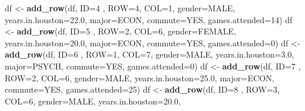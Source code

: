 \documentclass[
]{book}
\newenvironment{Shaded}{\begin{snugshade}}{\end{snugshade}}
\newcommand{\DataTypeTok}[1]{\textcolor[rgb]{0.13,0.29,0.53}{#1}}
\newcommand{\DecValTok}[1]{\textcolor[rgb]{0.00,0.00,0.81}{#1}}
\newcommand{\FloatTok}[1]{\textcolor[rgb]{0.00,0.00,0.81}{#1}}
\newcommand{\KeywordTok}[1]{\textcolor[rgb]{0.13,0.29,0.53}{\textbf{#1}}}
\newcommand{\NormalTok}[1]{#1}
\newcommand{\StringTok}[1]{\textcolor[rgb]{0.31,0.60,0.02}{#1}}
\begin{document}
\begin{Shaded}
\begin{Highlighting}[]
\NormalTok{df \textless{}{-}}\StringTok{ }\KeywordTok{add\_row}\NormalTok{(df, }\DataTypeTok{ID=}\DecValTok{4}\NormalTok{ , }\DataTypeTok{ROW=}\DecValTok{4}\NormalTok{, }\DataTypeTok{COL=}\DecValTok{1}\NormalTok{,  }\DataTypeTok{gender=}\StringTok{\textquotesingle{}MALE\textquotesingle{}}\NormalTok{,   }\DataTypeTok{years.in.houston=}\FloatTok{22.0}\NormalTok{,}
              \DataTypeTok{major=}\StringTok{\textquotesingle{}ECON\textquotesingle{}}\NormalTok{, }\DataTypeTok{commute=}\StringTok{\textquotesingle{}YES\textquotesingle{}}\NormalTok{, }\DataTypeTok{games.attended=}\DecValTok{14}\NormalTok{)}
\NormalTok{df \textless{}{-}}\StringTok{ }\KeywordTok{add\_row}\NormalTok{(df, }\DataTypeTok{ID=}\DecValTok{5}\NormalTok{ , }\DataTypeTok{ROW=}\DecValTok{2}\NormalTok{, }\DataTypeTok{COL=}\DecValTok{6}\NormalTok{,  }\DataTypeTok{gender=}\StringTok{\textquotesingle{}FEMALE\textquotesingle{}}\NormalTok{, }\DataTypeTok{years.in.houston=}\FloatTok{20.0}\NormalTok{,}
              \DataTypeTok{major=}\StringTok{\textquotesingle{}ECON\textquotesingle{}}\NormalTok{, }\DataTypeTok{commute=}\StringTok{\textquotesingle{}YES\textquotesingle{}}\NormalTok{, }\DataTypeTok{games.attended=}\DecValTok{0}\NormalTok{)}
\NormalTok{df \textless{}{-}}\StringTok{ }\KeywordTok{add\_row}\NormalTok{(df, }\DataTypeTok{ID=}\DecValTok{6}\NormalTok{ , }\DataTypeTok{ROW=}\DecValTok{1}\NormalTok{, }\DataTypeTok{COL=}\DecValTok{7}\NormalTok{,  }\DataTypeTok{gender=}\StringTok{\textquotesingle{}MALE\textquotesingle{}}\NormalTok{,   }\DataTypeTok{years.in.houston=}\FloatTok{3.0}\NormalTok{,}
              \DataTypeTok{major=}\StringTok{\textquotesingle{}PSYCH\textquotesingle{}}\NormalTok{, }\DataTypeTok{commute=}\StringTok{\textquotesingle{}YES\textquotesingle{}}\NormalTok{, }\DataTypeTok{games.attended=}\DecValTok{0}\NormalTok{)}
\NormalTok{df \textless{}{-}}\StringTok{ }\KeywordTok{add\_row}\NormalTok{(df, }\DataTypeTok{ID=}\DecValTok{7}\NormalTok{ , }\DataTypeTok{ROW=}\DecValTok{2}\NormalTok{, }\DataTypeTok{COL=}\DecValTok{6}\NormalTok{,  }\DataTypeTok{gender=}\StringTok{\textquotesingle{}MALE\textquotesingle{}}\NormalTok{,   }\DataTypeTok{years.in.houston=}\FloatTok{25.0}\NormalTok{,}
              \DataTypeTok{major=}\StringTok{\textquotesingle{}ECON\textquotesingle{}}\NormalTok{, }\DataTypeTok{commute=}\StringTok{\textquotesingle{}YES\textquotesingle{}}\NormalTok{, }\DataTypeTok{games.attended=}\DecValTok{25}\NormalTok{)}
\NormalTok{df \textless{}{-}}\StringTok{ }\KeywordTok{add\_row}\NormalTok{(df, }\DataTypeTok{ID=}\DecValTok{8}\NormalTok{ , }\DataTypeTok{ROW=}\DecValTok{3}\NormalTok{, }\DataTypeTok{COL=}\DecValTok{6}\NormalTok{,  }\DataTypeTok{gender=}\StringTok{\textquotesingle{}MALE\textquotesingle{}}\NormalTok{,   }\DataTypeTok{years.in.houston=}\FloatTok{20.0}\NormalTok{,}

\end{Highlighting}
\end{Shaded}
\end{document}
